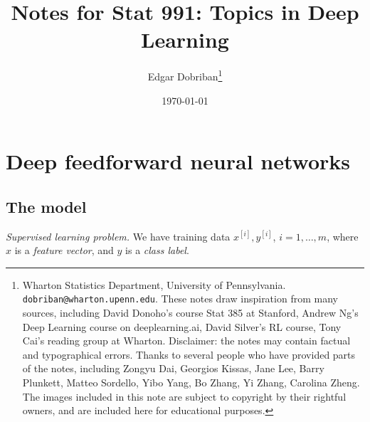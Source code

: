 \documentclass[english]{article}
\begin{document}
\title{Notes for Stat 991: Topics in Deep Learning}
\date{\today}
\author{Edgar Dobriban\footnote{Wharton Statistics Department, University of Pennsylvania. \texttt{dobriban@wharton.upenn.edu}.  These notes draw inspiration from many sources, including David Donoho's course Stat 385 at Stanford, Andrew Ng's Deep Learning course on deeplearning.ai, David Silver's RL course, Tony Cai's reading group at Wharton. Disclaimer: the notes may contain factual and typographical errors. Thanks to several people who have provided parts of the notes, including Zongyu Dai, Georgios Kissas, Jane Lee, Barry Plunkett, Matteo Sordello, Yibo Yang, Bo Zhang, Yi Zhang, Carolina Zheng. The images included in this note are subject to copyright by their rightful owners, and are included here for educational purposes.}}

\maketitle




\tableofcontents

\medskip















\section{Deep feedforward neural networks}
\subsection{The model}
\benum
\item \emph{Supervised learning problem.} We have training data $x^{[i]},y^{[i]}$, $i=1,\ldots, m$, where $x$ is a \emph{feature vector}, and $y$ is a \emph{class label}.
\end{document}
